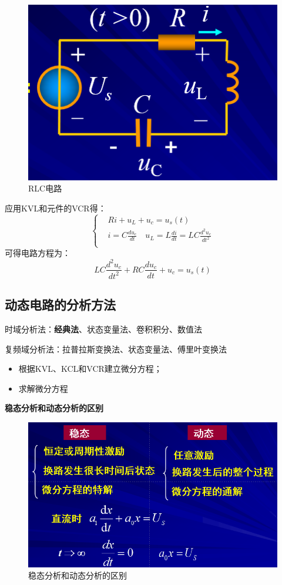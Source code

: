 \documentclass[11pt,a4paper,oneside]{book}
\begin{document}
\begin{enumerate}
	\begin{figure}[H]
		\centering
		\includegraphics[width=0.5\linewidth]{screenshot080}
		\caption{RLC电路}
		\label{fig:screenshot080}
	\end{figure}
	应用KVL和元件的VCR得：
	\begin{equation}
		\left\{
		\begin{aligned}
			&Ri+u_L+u_c=u_s(t) \\
			&i=C\frac{du_c}{dt} \quad u_L=L\frac{di}{dt}=LC\frac{d^2u_c}{dt^2} \\
		\end{aligned}\right.	\end{equation}
	可得电路方程为：
	\begin{equation}
		LC\frac{d^2u_c}{dt^2}+RC\frac{du_c}{dt}+u_c=u_s(t)
	\end{equation}
\end{enumerate}

\subsection{动态电路的分析方法}
时域分析法：\textbf{经典法}、状态变量法、卷积积分、数值法

复频域分析法：拉普拉斯变换法、状态变量法、傅里叶变换法
\begin{itemize}
	\item 根据KVL、KCL和VCR建立微分方程；
	\item 求解微分方程
\end{itemize}

\textbf{稳态分析和动态分析的区别}
\begin{figure}[H]
	\centering
	\includegraphics[width=0.7\linewidth]{screenshot081}
	\caption{稳态分析和动态分析的区别}
	\label{fig:screenshot081}
\end{figure}
\end{document}
